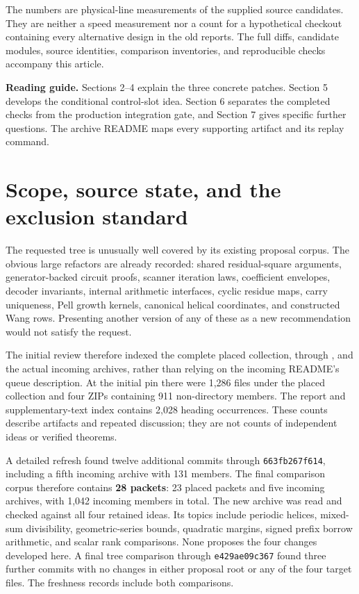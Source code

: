 \documentclass[11pt]{article}
\newcommand{\name}[1]{\texttt{\detokenize{#1}}}
\newcommand{\freshpin}{\texttt{e429ae09c367}}
\begin{document}
The numbers are physical-line measurements of the supplied source candidates.
They are neither a speed measurement nor a count for a hypothetical checkout
containing every alternative design in the old reports. The full diffs,
candidate modules, source identities, comparison inventories, and reproducible
checks accompany this article.

\vspace{8pt}
\textbf{Reading guide.} Sections 2--4 explain the three concrete patches.
Section 5 develops the conditional control-slot idea. Section 6 separates
the completed checks from the production integration gate, and Section 7
gives specific further questions. The archive README maps every supporting
artifact and its replay command.
\newpage

\section{Scope, source state, and the exclusion standard}

The requested tree is unusually well covered by its existing proposal corpus.
The obvious large refactors are already recorded: shared residual-square
arguments, generator-backed circuit proofs, scanner iteration laws, coefficient
envelopes, decoder invariants, internal arithmetic interfaces, cyclic residue
maps, carry uniqueness, Pell growth kernels, canonical helical coordinates,
and constructed Wang rows. Presenting another version of any of these as a new
recommendation would not satisfy the request.

The initial review therefore indexed the complete placed collection,
\name{2026-10-26a} through \name{2026-10-26w}, and the actual incoming archives,
rather than relying on the incoming README's queue description. At the initial
pin there were 1,286 files under the placed collection and four ZIPs containing
911 non-directory members. The report and supplementary-text index contains
2,028 heading occurrences. These counts describe artifacts and repeated
discussion; they are not counts of independent ideas or verified theorems.

A detailed refresh found twelve additional commits through \texttt{663fb267f614},
including a fifth incoming archive with 131 members. The final comparison
corpus therefore contains \textbf{28 packets}: 23 placed packets and five
incoming archives, with 1,042 incoming members in total. The new archive was
read and checked against all four retained ideas. Its topics include periodic
helices, mixed-sum divisibility, geometric-series bounds, quadratic margins,
signed prefix borrow arithmetic, and scalar rank comparisons. None proposes
the four changes developed here. A final tree comparison through \freshpin
found three further commits with no changes in either proposal root or any
of the four target files. The freshness records include both comparisons.
\end{document}
